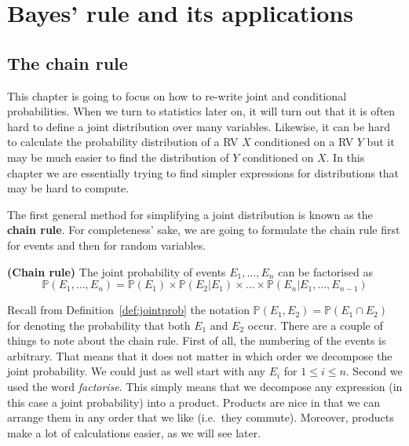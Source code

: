 
\setcounter{chapter}{3}
\chapter{Bayes' rule and its applications}

\section{The chain rule}

This chapter is going to focus on how to re-write joint and conditional probabilities. When we turn to statistics later on, it will
turn out that it is often hard to define a joint distribution over many variables. Likewise, it can be hard to calculate 
the probability distribution of a RV $ X $ conditioned on a RV $ Y $ but it may be much easier to find the distribution of $ Y $
conditioned on $ X $. In this chapter we are essentially trying to find simpler expressions for distributions that may be hard to
compute.

The first general method for simplifying a joint distribution is known as the \textbf{chain rule}.  For completeness' sake, we are going to formulate the chain rule first for events and then for random variables.

\begin{Theorem}{\textbf{(Chain rule)}} \label{thm:chain}
The joint probability of events $ E_{1}, \ldots, E_{n} $ can be factorised as
$$ \mathbb{P}(E_{1}, \ldots, E_{n}) = \mathbb{P}(E_{1}) \times \mathbb{P}(E_{2}|E_{1}) \times \ldots \times \mathbb{P}(E_{n}|E_{1}, \ldots, E_{n-1}) $$
\end{Theorem} 
Recall from Definition~\ref{def:jointprob} the notation $\mathbb{P}(E_1,E_2) = \mathbb{P}(E_1 \cap E_2)$ for denoting the probability that both $E_1$ and $E_2$ occur. There are a couple of things to note about the chain rule. First of all, the numbering of the events is arbitrary. That means that it does not matter in which
order we decompose the joint probability. We could just as well start with any $ E_{i} $ for $ 1 \leq i \leq n $. Second we used the 
word \textit{factorise}. This simply means that we decompose any expression (in this case a joint probability) into a product. Products are
nice in that we can arrange them in any order that we like (i.e.\ they commute). Moreover, products make a lot of calculations easier, as we will
see later.

